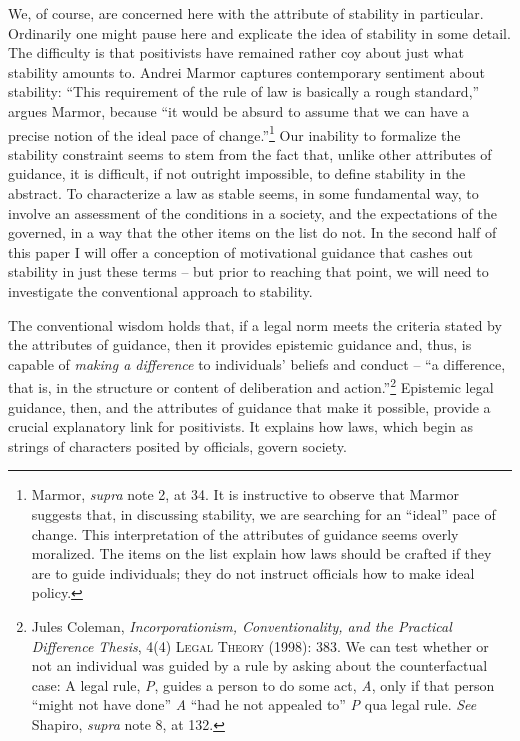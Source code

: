 We, of course, are concerned here with the attribute of stability in
particular. Ordinarily one might pause here and explicate the idea of
stability in some detail. The difficulty is that positivists have
remained rather coy about just what stability amounts to. Andrei Marmor
captures contemporary sentiment about stability: ``This requirement of
the rule of law is basically a rough standard,'' argues Marmor, because
``it would be absurd to assume that we can have a precise notion of the
ideal pace of change.''\footnote{Marmor, \emph{supra} note 2\textsc{,}
  at 34. It is instructive to observe that Marmor suggests that, in
  discussing stability, we are searching for an ``ideal'' pace of
  change. This interpretation of the attributes of guidance seems overly
  moralized. The items on the list explain how laws should be crafted if
  they are to guide individuals; they do not instruct officials how to
  make ideal policy.} Our inability to formalize the stability
constraint seems to stem from the fact that, unlike other attributes of
guidance, it is difficult, if not outright impossible, to define
stability in the abstract. To characterize a law as stable seems, in
some fundamental way, to involve an assessment of the conditions in a
society, and the expectations of the governed, in a way that the other
items on the list do not. In the second half of this paper I will offer
a conception of motivational guidance that cashes out stability in just
these terms -- but prior to reaching that point, we will need to
investigate the conventional approach to stability.

The conventional wisdom holds that, if a legal norm meets the criteria
stated by the attributes of guidance, then it provides epistemic
guidance and, thus, is capable of \emph{making a difference} to
individuals' beliefs and conduct -- ``a difference, that is, in the
structure or content of deliberation and action.''\footnote{Jules
  Coleman, \emph{Incorporationism, Conventionality, and the Practical
  Difference Thesis}, 4(4) \textsc{Legal Theory (1998): 383.} We can
  test whether or not an individual was guided by a rule by asking about
  the counterfactual case: A legal rule, \emph{P}, guides a person to do
  some act, \emph{A}, only if that person ``might not have done''
  \emph{A} ``had he not appealed to'' \emph{P} qua legal rule.
  \emph{See} Shapiro, \emph{supra} note 8, at 132.} Epistemic legal
guidance, then, and the attributes of guidance that make it possible,
provide a crucial explanatory link for positivists. It explains how
laws, which begin as strings of characters posited by officials, govern
society.

